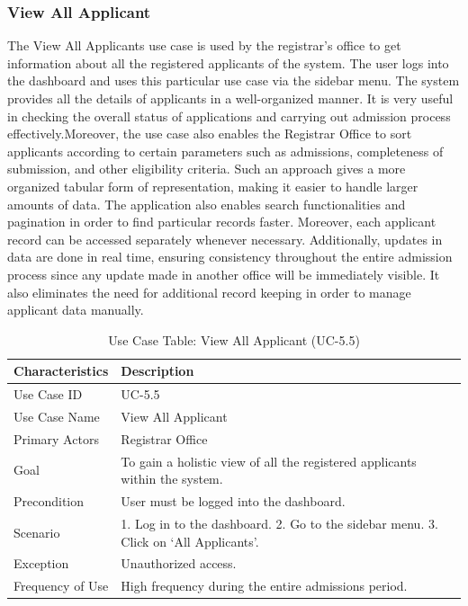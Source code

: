 \subsubsection{View All Applicant}
The View All Applicants use case is used by the registrar’s office to get information about all the registered applicants of the system. The user logs into the dashboard and uses this particular use case via the sidebar menu. The system provides all the details of applicants in a well-organized manner. It is very useful in checking the overall status of applications and carrying out admission process effectively.Moreover, the use case also enables the Registrar Office to sort applicants according to certain parameters such as admissions, completeness of submission, and other eligibility criteria. Such an approach gives a more organized tabular form of representation, making it easier to handle larger amounts of data. The application also enables search functionalities and pagination in order to find particular records faster. Moreover, each applicant record can be accessed separately whenever necessary. Additionally, updates in data are done in real time, ensuring consistency throughout the entire admission process since any update made in another office will be immediately visible. It also eliminates the need for additional record keeping in order to manage applicant data manually.
\begin{table}[H]
    \centering
    \small
    \renewcommand{\arraystretch}{1.4}
    \caption{Use Case Table: View All Applicant (UC-5.5)} %
    \label{tab:view-all-applicant-registrar}
    \begin{tabularx}{\textwidth}{|l|X|}
        \hline
        \rowcolor[gray]{0.9} {Characteristics} & {Description} \\ \hline
        Use Case ID & UC-5.5 \\ \hline
        Use Case Name & View All Applicant \\ \hline
        Primary Actors & Registrar Office \\ \hline
        Goal & To gain a holistic view of all the registered applicants within the system. \\ \hline
        Precondition & User must be logged into the dashboard. \\ \hline
        Scenario & 1. Log in to the dashboard. 2. Go to the sidebar menu. 3. Click on ‘All Applicants’. \\ \hline
        Exception & Unauthorized access. \\ \hline
        Frequency of Use & High frequency during the entire admissions period. \\ \hline
    \end{tabularx}
\end{table}
\FloatBarrier